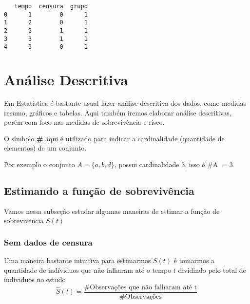 \documentclass[
  letterpaper,
  DIV=11,
  numbers=noendperiod]{scrreprt}
\begin{document}
\begin{verbatim}
   tempo  censura  grupo
0      1        0      1
1      2        0      1
2      3        1      1
3      3        1      1
4      3        0      1
\end{verbatim}

\hypertarget{anuxe1lise-descritiva}{%
\chapter{Análise Descritiva}\label{anuxe1lise-descritiva}}

Em Estatística é bastante usual fazer análise descritiva dos dados, como
medidas resumo, gráficos e tabelas. Aqui também iremos elaborar análise
descritivas, porém com foco nas medidas de sobrevivência e risco.

\begin{tcolorbox}[standard jigsaw,opacityback=0, bottomtitle=1mm, titlerule=0mm, rightrule=.15mm, toprule=.15mm, opacitybacktitle=0.6, title=\textcolor{quarto-callout-note-color}{\faInfo}\hspace{0.5em}{Nota}, arc=.35mm, colbacktitle=quarto-callout-note-color!10!white, bottomrule=.15mm, toptitle=1mm, leftrule=.75mm, left=2mm, colframe=quarto-callout-note-color-frame, coltitle=black, colback=white]
O símbolo \textbf{\#} aqui é utilizado para indicar a cardinalidade
(quantidade de elementos) de um conjunto.

Por exemplo o conjunto \(A = \{a,b,d\}\), possui cardinalidade 3, isso é
\#A \(=3\)
\end{tcolorbox}

\hypertarget{estimando-a-funuxe7uxe3o-de-sobrevivuxeancia}{%
\section{Estimando a função de
sobrevivência}\label{estimando-a-funuxe7uxe3o-de-sobrevivuxeancia}}

Vamos nessa subseção estudar algumas maneiras de estimar a função de
sobrevivência \(S(t)\)

\hypertarget{sem-dados-de-censura}{%
\subsection{Sem dados de censura}\label{sem-dados-de-censura}}

Uma maneira bastante intuitiva para estimarmos \(S(t)\) é tomarmos a
quantidade de indíviduos que não falharam até o tempo \(t\) dividindo
pelo total de indíviduos no estudo \[
\hat{S}(t) = \dfrac{\# \text{Observações que não falharam até t}}{\# \text{Observações}}
\]
\end{document}
